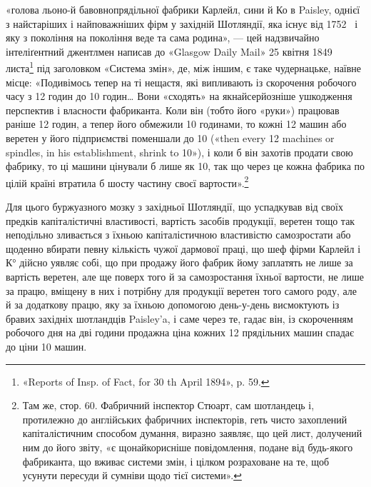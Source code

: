 \parcont{}  %
«голова льоно-й бавовнопрядільної фабрики Карлейл, сини й
Ко в Paisley, однієї з найстаріших і найповажніших фірм у західній
Шотляндії, яка існує від 1752~ і яку з покоління на покоління
веде та сама родина», — цей надзвичайно інтеліґентний
джентлмен написав до «Glasgow Daily Mail» 25 квітня 1849~
листа\footnote{
«Reports of Insp. of Fact, for 30 th April 1894», p. 59.
} під заголовком «Система змін», де, між іншим, є таке
чудернацьке, наївне місце: «Подивімось тепер на ті нещастя,
які випливають із скорочення робочого часу з 12 годин до 10 годин\dots{}
Вони «сходять» на якнайсерйозніше ушкодження перспектив
і власности фабриканта. Коли він (тобто його «руки») працював
раніше 12 годин, а тепер його обмежили 10 годинами, то кожні
12 машин або веретен у його підприємстві поменшали до 10 («then
every 12 machines or spindles, in his establishment, shrink to 10»),
і коли б він захотів продати свою фабрику, то ці машини цінували
б лише як 10, так що через це кожна фабрика по цілій країні
втратила б шосту частину своєї вартости».\footnote{
Там же, стор. 60. Фабричний інспектор Стюарт, сам шотландець і,
протилежно до англійських фабричних інспекторів, геть чисто захоплений
капіталістичним способом думання, виразно заявляє, що цей лист,
долучений ним до його звіту, «є щонайкорисніше повідомлення, подане від
будь-якого фабриканта, що вживає системи змін, і цілком розраховане
на те, щоб усунути пересуди й сумніви щодо тієї системи».
}

Для цього буржуазного мозку з західньої Шотляндії, що
успадкував від своїх предків капіталістичні властивості, вартість
засобів продукції, веретен тощо так неподільно зливається з
їхньою капіталістичною властивістю самозростати або щоденно вбирати
певну кількість чужої дармової праці, що шеф фірми Карлейл
і К° дійсно уявляє собі, що при продажу його фабрик йому
заплатять не лише за вартість веретен, але ще поверх того й за
самозростання їхньої вартости, не лише за працю, вміщену в них
і потрібну для продукції веретен того самого роду, але й за додаткову
працю, яку за їхньою допомогою день-у-день висмоктують
із бравих західніх шотландців Paisley’a, і саме через те,
гадає він, із скороченням робочого дня на дві години продажна
ціна кожних 12 прядільних машин спадає до ціни 10 машин.
